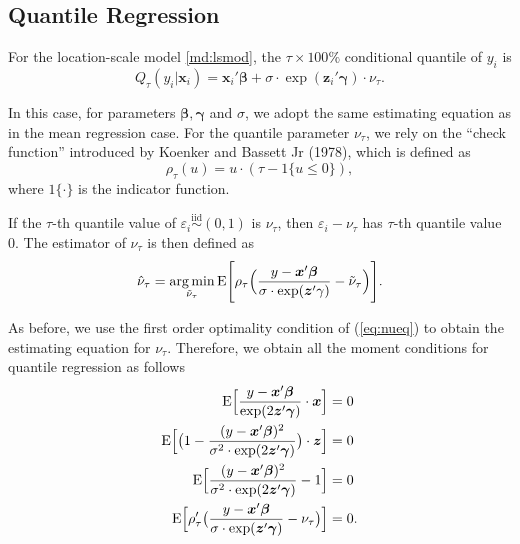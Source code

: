 \documentclass[article]{jss}
\renewcommand{\|}{\,|\,}
\begin{document}
\hypertarget{quantile-regression}{%
\subsection{Quantile Regression}\label{quantile-regression}}

For the location-scale model \eqref{md:lsmod}, the \(\tau\times 100\%\) conditional quantile of \(y_i\) is
\begin{equation} \label{eq:lsqr}
  Q_{\tau}(y_i|\bm x_i) = \bm x_i' \bm \beta+ \sigma\cdot\exp(\bm z_i' \bm \gamma)\cdot\nu_{\tau}.
\end{equation}

In this case, for parameters \(\bm \beta,\bm \gamma\) and \(\sigma\), we adopt the same estimating equation as in the mean regression case. For the quantile parameter \(\nu_{\tau}\), we rely on the ``check function'' introduced by Koenker and Bassett Jr (1978), which is defined as
\begin{equation}\label{eq:check}
\rho_\tau(u) = u\cdot(\tau - \mathfrak 1 \{u \le 0\}),
\end{equation}
where \(\mathfrak 1\{\cdot\}\) is the indicator function.

If the \(\tau\)-th quantile value of \(\varepsilon_i\stackrel {\textrm{iid}}{\sim}(0,1)\) is \(\nu_{\tau}\), then \(\varepsilon_i-\nu_{\tau}\) has \(\tau\)-th quantile value \(0\). The estimator of \(\nu_{\tau}\) is then defined as
\begin{equation}\label{eq:nueq}
  \hat\nu_{\tau} = \mathop{\mathrm{arg\,min}}_{\tilde\nu_{\tau}} \textrm{E}\Biggl[\rho_{\tau}\Bigl(\frac{y-\bm x'\bm \beta}{\sigma\cdot\exp(\bm z'\gamma)}-\tilde\nu_{\tau}\Bigr)\Biggr].
\end{equation}

As before, we use the first order optimality condition of (\ref{eq:nueq}) to obtain the estimating equation for \(\nu_{\tau}\). Therefore, we obtain all the moment conditions for quantile regression as follows
\begin{equation} \label{eq:qrls}
\begin{split}
  \textrm{E}\Bigl[\frac{y-\bm x'\bm \beta}{\exp(2\bm z'\bm \gamma)}\cdot\bm x\Bigr] &= 0 \\
  \textrm{E}\Bigl[\bigl(1-\frac{(y-\bm x'\bm \beta)^2}{\sigma^2\cdot\exp(2\bm z'\bm \gamma)}\bigr)\cdot\bm z\Bigr] &= 0 \\
  \textrm{E}\Bigl[\frac{(y-\bm x'\bm \beta)^2}{\sigma^2\cdot\exp(2\bm z'\bm \gamma)}-1\Bigr] &= 0 \\
  \textrm{E}\Bigl[\rho'_{\tau}\bigl(\frac{y-\bm x'\bm \beta}{\sigma\cdot\exp(\bm z'\bm \gamma)}-\nu_{\tau}\bigr)\Bigr] &= 0.
\end{split}
\end{equation}
\end{document}
